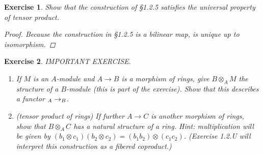 \documentclass{article}
\theoremstyle{breakstyle}
\newtheorem{exercise}{Exercise}[section]
\let\mod\relax
\DeclareMathOperator{\mod}{Mod}
\begin{document}
\begin{exercise}
Show that the construction of \S\emph{1.2.5} satisfies the universal
property of tensor product.

\begin{proof}
    Because the construction in \S\emph{1.2.5} is a bilinear map, is unique up
    to isomorphism.
\end{proof}

\end{exercise}

\begin{exercise}
IMPORTANT EXERCISE.

\begin{enumerate}[label=({\alph*})]
\item If $M$ is an $A$-module and $A \to B$ is a morphism of rings, give
    $B \otimes_A M$ the structure of a $B$-module (this is part of the
    exercise). Show that this describes a functor $\mod_A \to \mod_B$.
\item (tensor product of rings) If further $A \to C$ is another morphism of
    rings, show that $B \otimes_A C$ has a natural structure of a ring.
    Hint: multiplication will be given by
    $(b_1 \otimes c_1)(b_2 \otimes c_2) = (b_1 b_2) \otimes (c_1 c_2)$.
    (Exercise 1.2.U will interpret this construction as a fibered
    coproduct.)
\end{enumerate}


\end{exercise}
\end{document}
